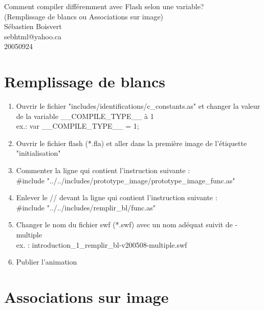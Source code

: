 \documentclass[letterpaper]{article}
\begin{document}
\begin{center}
Comment compiler différemment avec Flash selon une variable?\\
(Remplissage de blancs ou Associations sur image)\\

Sébastien Boisvert \\
sebhtml@yahoo.ca\\
20050924\\
\end{center}

\pagebreak
\section{Remplissage de blancs}

\begin{enumerate}


\item 
Ouvrir le fichier "includes/identifications/c\_constants.as" et changer la valeur de la variable \_\_COMPILE\_TYPE\_\_ à 1 \\
ex.: var \_\_COMPILE\_TYPE\_\_ = 1;

\item 
Ouvrir le fichier flash (*.fla) et aller dans la première image de l'étiquette "initialisation"

\item 
Commenter la ligne qui contient l'instruction suivante :\\
\#include "../../includes/prototype\_image/prototype\_image\_func.as"

\item 
Enlever le // devant la ligne qui contient l'instruction suivante :\\
\#include "../../includes/remplir\_bl/func.as"




\item 
Changer le nom du fichier swf (*.swf) avec un nom adéquat suivit de -multiple \\
ex. : introduction\_1\_remplir\_bl-v200508-multiple.swf

\item 
Publier l'animation


\end{enumerate}


\section{Associations sur image}
\end{document}
